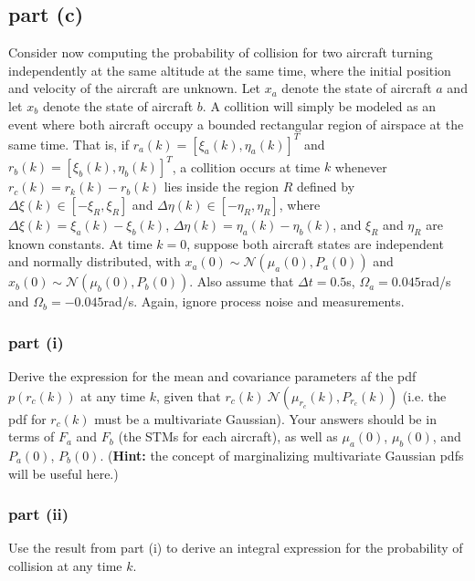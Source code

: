 \documentclass[11pt]{article}
\begin{document}
\subsection*{part (c)}
Consider now computing the probability of collision for two aircraft turning independently at the same altitude at the same time, where the initial position and velocity of the aircraft are unknown. Let $x_a$ denote the state of aircraft $a$ and let $x_b$ denote the state of aircraft $b$. A collition will simply be modeled as an event where both aircraft occupy a bounded rectangular region of airspace at the same time. That is, if $r_a(k)=[\xi_a(k),\eta_a(k)]^T$ and $r_b(k)=[\xi_b(k),\eta_b(k)]^T$, a collition occurs at time $k$ whenever $r_c(k) = r_k(k)-r_b(k)$ lies inside the region $R$ defined by $\Delta\xi(k)\in[-\xi_R,\xi_R]$ and $\Delta\eta(k)\in[-\eta_R,\eta_R]$, where $\Delta\xi(k)=\xi_a(k)-\xi_b(k)$, $\Delta\eta(k)=\eta_a(k)-\eta_b(k)$, and $\xi_R$ and $\eta_R$ are known constants. At time $k=0$, suppose both aircraft states are independent and normally distributed, with $x_a(0)\sim\mathcal{N}(\mu_a(0),P_a(0))$ and $x_b(0)\sim\mathcal{N}(\mu_b(0),P_b(0))$. Also assume that $\Delta t=0.5$s, $\Omega_a=0.045$rad/s and $\Omega_b=-0.045$rad/s. Again, ignore process noise and measurements.

\subsubsection*{part (i)}
Derive the expression for the mean and covariance parameters af the pdf $p(r_c(k))$ at any time $k$, given that $r_c(k)~\mathcal{N}(\mu_{r_c}(k),P_{r_c}(k))$ (i.e. the pdf for $r_c(k)$ must be a multivariate Gaussian). Your answers should be in terms of $F_a$ and $F_b$ (the STMs for each aircraft), as well as $\mu_a(0)$, $\mu_b(0)$, and $P_a(0)$, $P_b(0)$. (\textbf{Hint:} the concept of marginalizing multivariate Gaussian pdfs will be useful here.)

\subsubsection*{part (ii)}
Use the result from part (i) to derive an integral expression for the probability of collision at any time $k$.
\end{document}
